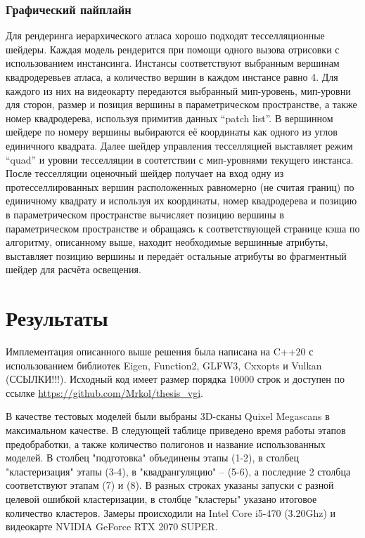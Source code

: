 \documentclass[12pt]{extarticle}
\begin{document}
\subsubsection{Графический пайплайн}
Для рендеринга иерархического атласа хорошо подходят тесселляционные шейдеры. Каждая модель рендерится при помощи одного вызова отрисовки с использованием инстансинга. Инстансы соответствуют выбранным вершинам квадродеревьев атласа, а количество вершин в каждом инстансе равно 4. Для каждого из них на видеокарту передаются выбранный мип-уровень, мип-уровни для сторон, размер и позиция вершины в параметрическом пространстве, а также номер квадродерева, используя примитив данных ``patch list''. В вершинном шейдере по номеру вершины выбираются её координаты как одного из углов единичного квадрата. Далее шейдер управления тесселляцией выставляет режим ``quad'' и уровни тесселляции в соотетствии с мип-уровнями текущего инстанса. После тесселляции оценочный шейдер получает на вход одну из протесселлированных вершин расположенных равномерно (не считая границ) по единичному квадрату и используя их координаты, номер квадродерева и позицию в параметрическом пространстве вычисляет позицию вершины в параметрическом пространстве и обращаясь к соответствующей странице кэша по алгоритму, описанному выше, находит необходимые вершинные атрибуты, выставляет позицию вершины и передаёт остальные атрибуты во фрагментный шейдер для расчёта освещения.

\section{Результаты}
Имплементация описанного выше решения была написана на C++20 с использованием библиотек Eigen, Function2, GLFW3, Cxxopts и Vulkan (ССЫЛКИ!!!). Исходный код имеет размер порядка 10000 строк и доступен по ссылке \url{https://github.com/Mrkol/thesis_vgi}.

В качестве тестовых моделей были выбраны 3D-сканы Quixel Megascans \cite{quixel_megascans} в максимальном качестве. В следующей таблице приведено время работы этапов предобработки, а также количество полигонов и название использованных моделей. В столбец "подготовка" объединены этапы (1-2), в столбец "кластеризация" этапы (3-4), в "квадрангуляцию" -- (5-6), а последние 2 столбца соответствуют этапам (7) и (8). В разных строках указаны запуски с разной целевой ошибкой кластеризации, в столбце "кластеры" указано итоговое количество кластеров. Замеры происходили на Intel Core i5-470 (3.20Ghz) и видеокарте NVIDIA GeForce RTX 2070 SUPER.
\end{document}
